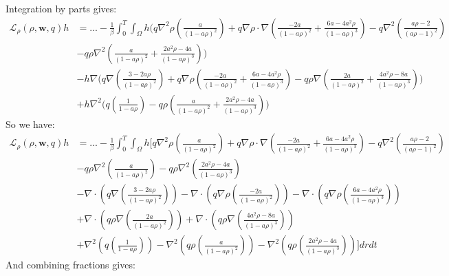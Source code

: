 \documentclass[11pt, a4paper]{article}
\theoremstyle{definition}
\newcommand{\w}{\mathbf{w}}
\begin{document}
Integration by parts gives:
\begin{align*}
	\mathcal{L}_\rho(\rho,\w,q)h &=... -\frac{1}{\beta}\int_0^T \int_\Omega h \bigg(q\nabla^2 \rho \left(\frac{a}{(1- a\rho)^2}\right)  + q \nabla \rho \cdot \nabla \left(\frac{-2a }{(1-a\rho)^2} + \frac{6a-4a^2  \rho}{(1-a\rho)^3} \right) - q \nabla^2 \left(\frac{a\rho -2}{(a\rho -1)^2}\right)\\
	&- q\rho  \nabla^2  \left(\frac{a }{(1-a\rho)^2} + \frac{2a^2\rho -4a}{(1-a\rho)^3} \right)\bigg)\\
	&-  h \nabla \bigg( q  \nabla \left( \frac{3-2a\rho}{(1-a\rho)^2} \right) + q \nabla \rho  \left( \frac{-2a }{(1-a\rho)^2} + \frac{6a-4a^2  \rho}{(1-a\rho)^3}  \right)- q\rho \nabla \left(\frac{2a }{(1-a\rho)^2} + \frac{4a^2\rho -8a}{(1-a\rho)^3} \right) \bigg)\\
	&+  h \nabla^2\bigg(q \left(\frac{1}{1- a\rho} \right)  - q\rho  \left(\frac{a }{(1-a\rho)^2} + \frac{2a^2\rho -4a}{(1-a\rho)^3} \right)  \bigg)
\end{align*}
So we have:
\begin{align*}
	\mathcal{L}_\rho(\rho,\w,q)h &=... -\frac{1}{\beta}\int_0^T\int_\Omega h \bigg[  q\nabla^2 \rho \left(\frac{a}{(1- a\rho)^2}\right)  + q \nabla \rho \cdot \nabla \left(\frac{-2a }{(1-a\rho)^2}+ \frac{6a-4a^2  \rho}{(1-a\rho)^3}  \right) - q \nabla^2 \left(\frac{a\rho -2}{(a\rho -1)^2}\right)\\
	&- q\rho  \nabla^2  \left(\frac{a }{(1-a\rho)^2} \right) - q\rho  \nabla^2  \left(\frac{2a^2\rho -4a}{(1-a\rho)^3} \right)\\
	& -\nabla \cdot \left( q  \nabla \left( \frac{3-2a\rho}{(1-a\rho)^2} \right) \right) - \nabla \cdot \left( q \nabla \rho  \left( \frac{-2a }{(1-a\rho)^2} \right)\right)  - \nabla \cdot \left( q \nabla \rho  \left(\frac{6a-4a^2  \rho}{(1-a\rho)^3}  \right)\right)  \\
	& + \nabla \cdot\left( q\rho \nabla \left(\frac{2a }{(1-a\rho)^2} \right) \right) + \nabla \cdot\left( q\rho \nabla \left( \frac{4a^2\rho -8a}{(1-a\rho)^3} \right) \right)\\
	&+   \nabla^2 \left(q \left(\frac{1}{1- a\rho} \right) \right) - \nabla^2 \left(q\rho  \left(\frac{a }{(1-a\rho)^2}\right)\right) - \nabla^2 \left(q\rho \left(\frac{2a^2\rho -4a}{(1-a\rho)^3} \right)\right)\bigg] dr dt 
\end{align*}
And combining fractions gives:
\end{document}
